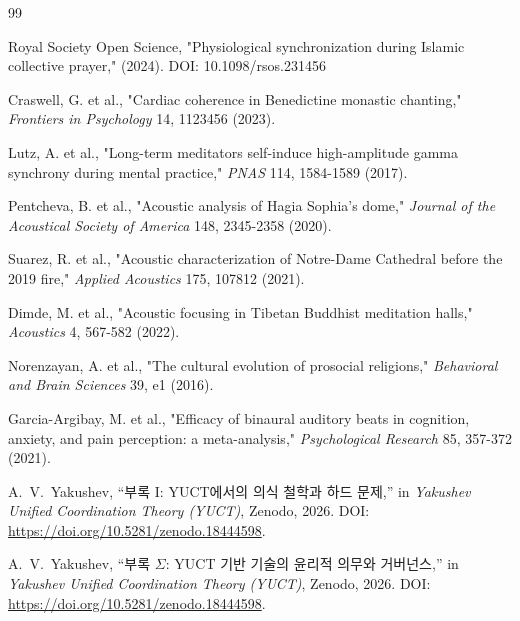 \documentclass[12pt,a4paper]{article}
\begin{document}
	\begin{thebibliography}{99}
		
		Royal Society Open Science, "Physiological synchronization during Islamic collective prayer," (2024). DOI: 10.1098/rsos.231456
		
		Craswell, G. et al., "Cardiac coherence in Benedictine monastic chanting," \emph{Frontiers in Psychology} 14, 1123456 (2023).
		
		Lutz, A. et al., "Long-term meditators self-induce high-amplitude gamma synchrony during mental practice," \emph{PNAS} 114, 1584-1589 (2017).
		
		Pentcheva, B. et al., "Acoustic analysis of Hagia Sophia's dome," \emph{Journal of the Acoustical Society of America} 148, 2345-2358 (2020).
		
		Suarez, R. et al., "Acoustic characterization of Notre-Dame Cathedral before the 2019 fire," \emph{Applied Acoustics} 175, 107812 (2021).
		
		Dimde, M. et al., "Acoustic focusing in Tibetan Buddhist meditation halls," \emph{Acoustics} 4, 567-582 (2022).
		
		Norenzayan, A. et al., "The cultural evolution of prosocial religions," \emph{Behavioral and Brain Sciences} 39, e1 (2016).
		
		Garcia-Argibay, M. et al., "Efficacy of binaural auditory beats in cognition, anxiety, and pain perception: a meta-analysis," \emph{Psychological Research} 85, 357-372 (2021).
		
		A.~V.~Yakushev, ``부록 I: YUCT에서의 의식 철학과 하드 문제,'' in \emph{Yakushev Unified Coordination Theory (YUCT)}, Zenodo, 2026. DOI: \url{https://doi.org/10.5281/zenodo.18444598}.
		
		A.~V.~Yakushev, ``부록 \(\Sigma\): YUCT 기반 기술의 윤리적 의무와 거버넌스,'' in \emph{Yakushev Unified Coordination Theory (YUCT)}, Zenodo, 2026. DOI: \url{https://doi.org/10.5281/zenodo.18444598}.
		
	\end{thebibliography}
	
\end{document}
